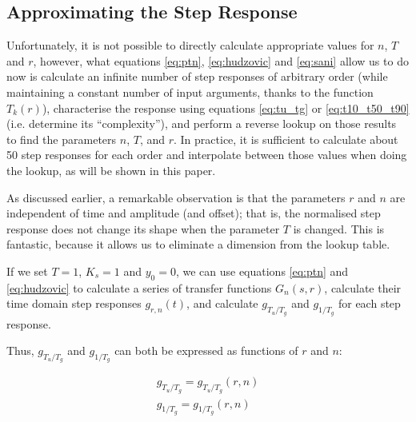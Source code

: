 \subsection{Approximating the Step Response}

Unfortunately, it is not  possible  to directly calculate appropriate values for
$n$, $T$ and  $r$,  however,  what equations \ref{eq:ptn}, \ref{eq:hudzovic} and
\ref{eq:sani}  allow  us  to  do  now  is  calculate an infinite number of  step
responses of arbitrary order  (while  maintaining  a  constant  number  of input
arguments, thanks to the  function  $T_k(r)$),  characterise  the response using
equations   \ref{eq:tu_tg}   or   \ref{eq:t10_t50_t90}   (i.e.   determine   its
``complexity''), and perform a reverse  lookup  on  those  results  to  find the
parameters  $n$,  $T$, and $r$. In practice, it is sufficient to calculate about
50 step responses for each order and interpolate between those values when doing
the lookup, as will be shown in this paper.

As discussed earlier, a remarkable  observation  is  that the parameters $r$ and
$n$ are independent of time and amplitude (and offset); that is,  the normalised
step response does not change its  shape when the parameter $T$ is changed. This
is fantastic,  because  it  allows  us  to eliminate a dimension from the lookup
table.

If we set $T=1$, $K_s=1$ and $y_0=0$, we  can  use  equations  \ref{eq:ptn}  and
\ref{eq:hudzovic} to  calculate  a  series  of  transfer  functions  $G_n(s,r)$,
calculate  their  time  domain  step  responses   $g_{r,n}(t)$,   and  calculate
$g_{T_u/T_g}$ and $g_{1/T_g}$ for each step response.

Thus, $g_{T_u/T_g}$ and $g_{1/T_g}$ can both be expressed as  functions  of  $r$
and $n$:

\begin{align}
    g_{T_u/T_g} = g_{T_u/T_g}(r, n) \\
    g_{1/T_g}  =  g_{1/T_g}(r,n)
\end{align}

